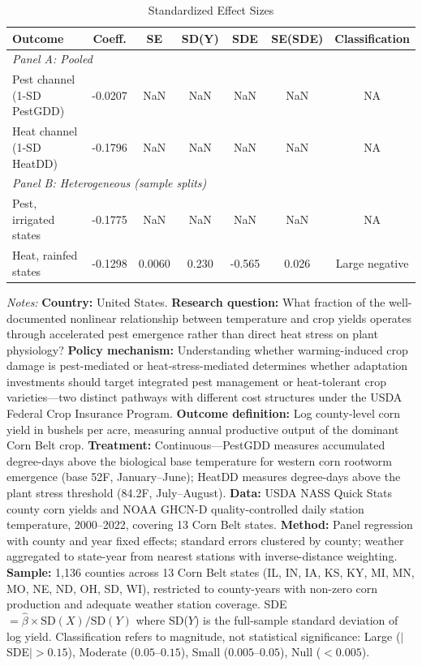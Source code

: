 \begin{table}[htbp]
\centering
\begin{threeparttable}
\caption{Standardized Effect Sizes}
\label{tab:sde}
\small
\begin{tabular}{lcccccc}
\toprule
Outcome & Coeff. & SE & SD(Y) & SDE & SE(SDE) & Classification \\
\midrule
\multicolumn{7}{l}{\textit{Panel A: Pooled}} \\
Pest channel (1-SD PestGDD) & -0.0207 & NaN & NaN & NaN & NaN & NA \\
Heat channel (1-SD HeatDD) & -0.1796 & NaN & NaN & NaN & NaN & NA \\
\midrule
\multicolumn{7}{l}{\textit{Panel B: Heterogeneous (sample splits)}} \\
Pest, irrigated states & -0.1775 & NaN & NaN & NaN & NaN & NA \\
Heat, rainfed states & -0.1298 & 0.0060 & 0.230 & -0.565 & 0.026 & Large negative \\
\bottomrule
\end{tabular}
\begin{tablenotes}[flushleft]
\footnotesize {}
\item \textit{Notes:} \textbf{Country:} United States. \textbf{Research question:} What fraction of the well-documented nonlinear relationship between temperature and crop yields operates through accelerated pest emergence rather than direct heat stress on plant physiology? \textbf{Policy mechanism:} Understanding whether warming-induced crop damage is pest-mediated or heat-stress-mediated determines whether adaptation investments should target integrated pest management or heat-tolerant crop varieties---two distinct pathways with different cost structures under the USDA Federal Crop Insurance Program. \textbf{Outcome definition:} Log county-level corn yield in bushels per acre, measuring annual productive output of the dominant Corn Belt crop. \textbf{Treatment:} Continuous---PestGDD measures accumulated degree-days above the biological base temperature for western corn rootworm emergence (base 52\textdegree{}F, January--June); HeatDD measures degree-days above the plant stress threshold (84.2\textdegree{}F, July--August). \textbf{Data:} USDA NASS Quick Stats county corn yields and NOAA GHCN-D quality-controlled daily station temperature, 2000--2022, covering 13 Corn Belt states. \textbf{Method:} Panel regression with county and year fixed effects; standard errors clustered by county; weather aggregated to state-year from nearest stations with inverse-distance weighting. \textbf{Sample:} 1,136 counties across 13 Corn Belt states (IL, IN, IA, KS, KY, MI, MN, MO, NE, ND, OH, SD, WI), restricted to county-years with non-zero corn production and adequate weather station coverage. SDE $= \hat{\beta} \times \text{SD}(X) / \text{SD}(Y)$ where SD($Y$) is the full-sample standard deviation of log yield. Classification refers to magnitude, not statistical significance: Large ($|$SDE$| > 0.15$), Moderate ($0.05$--$0.15$), Small ($0.005$--$0.05$), Null ($< 0.005$).
\end{tablenotes}
\end{threeparttable}
\end{table}
